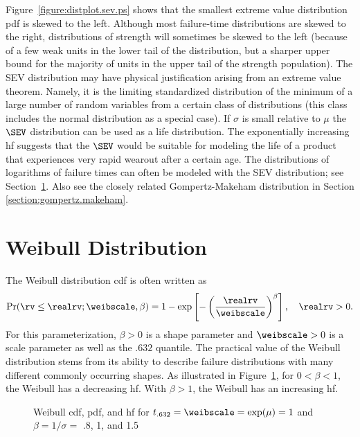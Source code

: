 Figure~\ref{figure:distplot.sev.ps} shows that the smallest extreme
value distribution pdf is skewed to the left. Although most
failure-time distributions are skewed to the right, distributions
of strength will sometimes be skewed to the left (because of a few
weak units in the lower tail of the distribution, but a sharper upper
bound for the majority of units in the upper tail of the strength
population).  The SEV distribution may have physical justification arising
from an extreme value theorem. Namely, it is the limiting 
standardized distribution of the minimum of
a large number of random variables from a certain class of
distributions (this class includes the normal distribution as a
special case).  If $\sigma$ is small relative to $\mu$ the $\SEV$
distribution can be used as a life distribution. The
exponentially increasing hf suggests that the $\SEV$
would be suitable for modeling the life of
a product that experiences very rapid
wearout after a certain age.  The distributions of logarithms of
failure times can often be modeled with the SEV distribution; see
Section~\ref{section:weibull.distribution}.  Also see the closely
related Gompertz-Makeham distribution in Section
\ref{section:gompertz.makeham}. 

\section{Weibull Distribution}
\label{section:weibull.distribution}
The Weibull distribution cdf is often written as
\begin{equation}
\label{equation:weibull.cdf}
\Pr(\rv \leq \realrv;\weibscale,\beta ) = 1-
\exp \left [-\left (\frac{\realrv}{\weibscale} \right )^{\beta}
\right ], \quad \realrv > 0.
\end{equation}
For this parameterization, $\beta > 0$ is a shape parameter and
$\weibscale > 0$ is a scale parameter as well as the $.632$ quantile.
The practical value of the Weibull distribution stems from its ability
to describe failure distributions with many different commonly
occurring shapes.  As illustrated in
Figure~\ref{figure:distplot.weib.ps}, for $0<\beta<1$, the Weibull
has a decreasing hf. With $\beta>1$, the Weibull has an
increasing hf.




\begin{figure}
\caption{Weibull cdf, pdf, and hf for
$t_{.632}=\weibscale=\exp(\mu)=1$ and  $\beta=1/\sigma=$ .8, 1, and 1.5}
\label{figure:distplot.weib.ps}
\end{figure}

